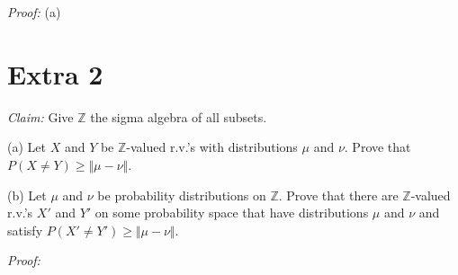 \documentclass[10pt]{article}
\begin{document}
\textit{Proof:}
(a)

\section{Extra 2}
\textit{Claim:}
Give $\mathbb{Z}$ the sigma algebra of all subsets.

(a) Let $X$ and $Y$ be $\mathbb{Z}$-valued r.v.'s with distributions
$\mu$ and $\nu$. Prove that $P(X \ne Y) \ge \Vert \mu - \nu \Vert$.

(b) Let $\mu$ and $\nu$ be probability distributions on $\mathbb{Z}$.
Prove that there are $\mathbb{Z}$-valued r.v.'s $X'$ and $Y'$ on some
probability space that have distributions $\mu$ and $\nu$ and satisfy
$P(X' \ne Y') \ge \Vert \mu - \nu \Vert$.

\textit{Proof:}
\end{document}

